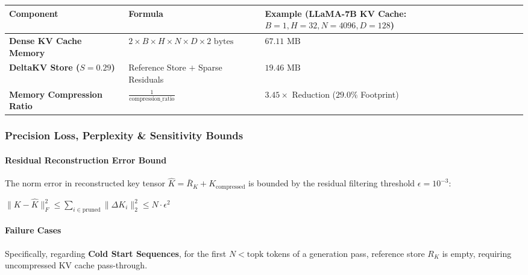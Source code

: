 \begin{center}
\begin{adjustbox}{max width=\columnwidth}
\renewcommand{\arraystretch}{1.2}
\begin{tabular}{lll}
\toprule
Component & Formula & Example (LLaMA-7B KV Cache: $B=1, H=32, N=4096, D=128$) \\
\midrule
\textbf{Dense KV Cache Memory} & $2 \times B \times H \times N \times D \times 2 \text{ bytes}$ & $67.11 \text{ MB}$ \\
\textbf{DeltaKV Store ($S=0.29$)} & Reference Store $+$ Sparse Residuals & $19.46 \text{ MB}$ \\
\textbf{Memory Compression Ratio} & $\frac{1}{\text{compression\_ratio}}$ & $\mathbf{3.45\times}$ Reduction ($29.0\%$ Footprint) \\

\bottomrule
\end{tabular}
\end{adjustbox}
\end{center}

\subsubsection*{Precision Loss, Perplexity \& Sensitivity Bounds}

\paragraph{Residual Reconstruction Error Bound}

The norm error in reconstructed key tensor $\widehat{K} = \bar{R}_K + K_{\text{compressed}}$ is bounded by the residual filtering threshold $\epsilon = 10^{-3}$:

\begin{center}
\begin{adjustbox}{max width=\columnwidth}
$\displaystyle
\| K - \widehat{K} \|_F^2 \le \sum_{i \in \text{pruned}} \| \Delta K_i \|_2^2 \le N \cdot \epsilon^2
$
\end{adjustbox}
\end{center}

\paragraph{Failure Cases}

Specifically, regarding \textbf{Cold Start Sequences}, for the first $N < \text{topk}$ tokens of a generation pass, reference store $R_K$ is empty, requiring uncompressed KV cache pass-through.



